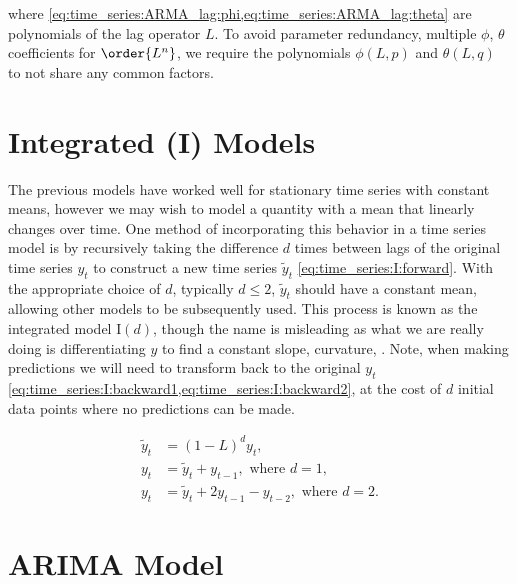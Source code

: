 \noindent where \cref{eq:time_series:ARMA_lag:phi,eq:time_series:ARMA_lag:theta} are polynomials of the lag operator $L$.
To avoid parameter redundancy, \ie multiple $\phi$, $\theta$ coefficients for $\order{L^{n}}$,
we require the polynomials $\phi\left(L,p\right)$ and $\theta\left(L,q\right)$ to not share any common factors.

\section{Integrated (I) Models}
\label{time_series:I}

The previous models have worked well for stationary time series with constant means,
however we may wish to model a quantity with a mean that linearly changes over time.
One method of incorporating this behavior in a time series model is by
recursively taking the difference $d$ times between lags of the original time series $y_{t}$
to construct a new time series $\widetilde{y}_{t}$ \cref{eq:time_series:I:forward}.
With the appropriate choice of $d$, typically $d \leq 2$,
$\widetilde{y}_{t}$ should have a constant mean,
allowing other models to be subsequently used.
This process is known as the integrated model $\text{I}\left(d\right)$,
though the name is misleading as what we are really doing is differentiating $y$ to find a constant slope, curvature, \etc.
Note, when making predictions we will need to
transform back to the original $y_{t}$ \cref{eq:time_series:I:backward1,eq:time_series:I:backward2},
at the cost of $d$ initial data points where no predictions can be made.

\begin{subequations}\label{eq:time_series:I}
\begin{align}
\widetilde{y}_{t} &= \left(1-L\right)^{d} y_{t}, \label{eq:time_series:I:forward} \\
y_{t} &= \widetilde{y}_{t} + y_{t-1},\,\, \text{where}\,\, d=1, \label{eq:time_series:I:backward1} \\
y_{t} &= \widetilde{y}_{t} + 2 y_{t-1} - y_{t-2},\,\, \text{where}\,\, d=2. \label{eq:time_series:I:backward2}
\end{align}
\end{subequations}

\section{ARIMA Model}
\label{time_series:ARIMA}

